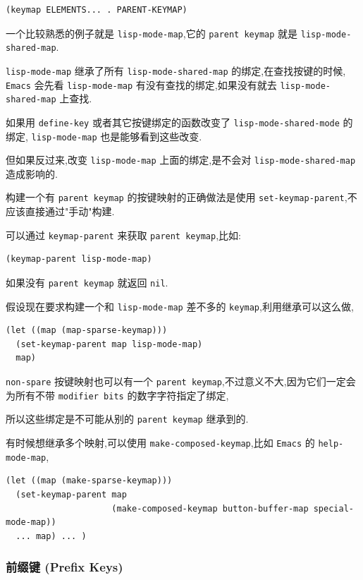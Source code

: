 \documentclass[11pt]{article}
\begin{document}
\begin{verbatim}
(keymap ELEMENTS... . PARENT-KEYMAP)
\end{verbatim}

一个比较熟悉的例子就是 \texttt{lisp-mode-map},它的 \texttt{parent keymap} 就是 \texttt{lisp-mode-shared-map}.

\texttt{lisp-mode-map} 继承了所有 \texttt{lisp-mode-shared-map} 的绑定,在查找按键的时候, \texttt{Emacs} 会先看 \texttt{lisp-mode-map} 有没有查找的绑定,如果没有就去 \texttt{lisp-mode-shared-map} 上查找.

如果用 \texttt{define-key} 或者其它按键绑定的函数改变了 \texttt{lisp-mode-shared-mode} 的绑定, \texttt{lisp-mode-map} 也是能够看到这些改变.

但如果反过来,改变 \texttt{lisp-mode-map} 上面的绑定,是不会对 \texttt{lisp-mode-shared-map} 造成影响的.

构建一个有 \texttt{parent keymap} 的按键映射的正确做法是使用 \texttt{set-keymap-parent},不应该直接通过"手动"构建.

可以通过 \texttt{keymap-parent} 来获取 \texttt{parent keymap},比如:

\begin{verbatim}
(keymap-parent lisp-mode-map)
\end{verbatim}

如果没有 \texttt{parent keymap} 就返回 \texttt{nil}.

假设现在要求构建一个和 \texttt{lisp-mode-map} 差不多的 \texttt{keymap},利用继承可以这么做,

\begin{verbatim}
(let ((map (map-sparse-keymap)))
  (set-keymap-parent map lisp-mode-map)
  map)
\end{verbatim}

\texttt{non-spare} 按键映射也可以有一个 \texttt{parent keymap},不过意义不大,因为它们一定会为所有不带 \texttt{modifier bits} 的数字字符指定了绑定,

所以这些绑定是不可能从别的 \texttt{parent keymap} 继承到的.

有时候想继承多个映射,可以使用 \texttt{make-composed-keymap},比如 \texttt{Emacs} 的 \texttt{help-mode-map},

\begin{verbatim}
(let ((map (make-sparse-keymap)))
  (set-keymap-parent map
                     (make-composed-keymap button-buffer-map special-mode-map))
  ... map) ... )
\end{verbatim}


\subsubsection{前缀键 (Prefix Keys)}
\label{sec:orge98dfc2}
\end{document}

